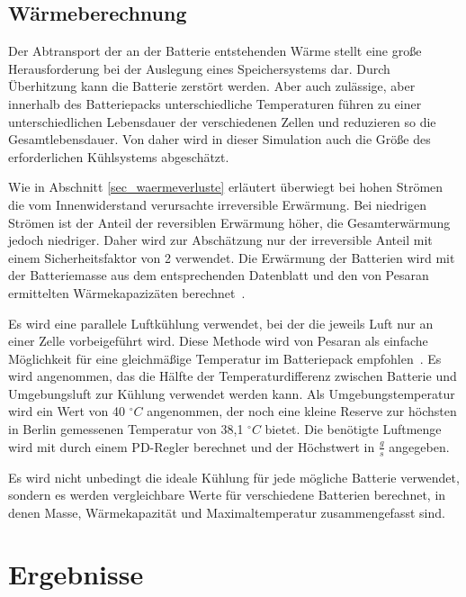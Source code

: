 \subsection{Wärmeberechnung}
Der Abtransport der an der Batterie entstehenden Wärme stellt eine große Herausforderung bei der Auslegung eines Speichersystems dar. Durch Überhitzung kann die Batterie zerstört werden. Aber auch zulässige, aber innerhalb des Batteriepacks unterschiedliche Temperaturen führen zu einer unterschiedlichen Lebensdauer der verschiedenen Zellen und reduzieren so die Gesamtlebensdauer. Von daher wird in dieser Simulation auch die Größe des erforderlichen Kühlsystems abgeschätzt.

Wie in Abschnitt \ref{sec_waermeverluste} erläutert überwiegt bei hohen Strömen die vom Innenwiderstand verursachte irreversible Erwärmung. Bei niedrigen Strömen ist der Anteil der reversiblen Erwärmung höher, die Gesamterwärmung jedoch niedriger. Daher wird zur Abschätzung nur der irreversible Anteil mit einem Sicherheitsfaktor von 2 verwendet. Die Erwärmung der Batterien wird mit der Batteriemasse aus dem entsprechenden Datenblatt und den von Pesaran ermittelten Wärmekapazizäten berechnet~\cite{pesaran2001battery}.

Es wird eine parallele Luftkühlung verwendet, bei der die jeweils Luft nur an einer Zelle vorbeigeführt wird. Diese Methode wird von Pesaran als einfache Möglichkeit für eine gleichmäßige Temperatur im Batteriepack empfohlen~\cite{pesaran2001battery}. Es wird angenommen, das die Hälfte der Temperaturdifferenz zwischen Batterie und Umgebungsluft zur Kühlung verwendet werden kann. Als Umgebungstemperatur wird ein Wert von 40 $^{\circ}C$ angenommen, der noch eine kleine Reserve zur höchsten in Berlin gemessenen Temperatur von 38,1 $^{\circ}C$ bietet\cite{tempRekord}. Die benötigte Luftmenge wird mit durch einem PD-Regler berechnet und der Höchstwert in $\frac{g}{s}$ angegeben.

Es wird nicht unbedingt die ideale Kühlung für jede mögliche Batterie verwendet, sondern es werden vergleichbare Werte für verschiedene Batterien berechnet, in denen Masse, Wärmekapazität und Maximaltemperatur zusammengefasst sind.

\section{Ergebnisse}

